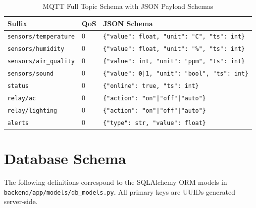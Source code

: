 \begin{table}[H]
\centering
\caption{MQTT Full Topic Schema with JSON Payload Schemas}
\label{tab:app_mqtt}
\begin{tabular}{@{}p{2.5cm}p{1.0cm}p{4.0cm}@{}}
\toprule
\textbf{Suffix} & \textbf{QoS} & \textbf{JSON Schema} \\
\midrule
\texttt{sensors/temperature} & 0 & \texttt{\{"value": float, "unit": "C", "ts": int\}} \\
\texttt{sensors/humidity}    & 0 & \texttt{\{"value": float, "unit": "\%", "ts": int\}} \\
\texttt{sensors/air\_quality}& 0 & \texttt{\{"value": int, "unit": "ppm", "ts": int\}} \\
\texttt{sensors/sound}       & 0 & \texttt{\{"value": 0|1, "unit": "bool", "ts": int\}} \\
\texttt{status}              & 0 & \texttt{\{"online": true, "ts": int\}} \\
\texttt{relay/ac}            & 0 & \texttt{\{"action": "on"|"off"|"auto"\}} \\
\texttt{relay/lighting}      & 0 & \texttt{\{"action": "on"|"off"|"auto"\}} \\
\texttt{alerts}              & 0 & \texttt{\{"type": str, "value": float\}} \\
\bottomrule
\end{tabular}
\end{table}

\section{Database Schema}
\label{app:db}

The following definitions correspond to the SQLAlchemy ORM models in
\texttt{backend/app/models/db\_models.py}. All primary keys are UUIDs
generated server-side.

